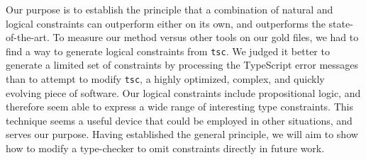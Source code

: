 \documentclass[sigplan,10pt,review,anonymous]{acmart} %
\theoremstyle{plain}
\theoremstyle{remark}
\theoremstyle{definition}
\begin{document}
Our purpose is to establish the principle that a combination of natural and logical constraints can outperform either on its own, and outperforms the state-of-the-art.
%
To measure our method versus other tools on our gold files, we had to find a way to generate logical constraints from \lstinline+tsc+.
%
We judged it better to generate a limited set of constraints by processing the
TypeScript error messages than to attempt to modify \lstinline+tsc+, a highly optimized, complex, and quickly evolving piece of software.
%
Our logical constraints include propositional logic, and therefore seem able to express a wide range of interesting type constraints.
%
This technique seems a useful device that could be employed in other situations, and serves our purpose.
%
Having established the general principle, we will aim to show how to modify a type-checker to omit constraints directly in future work.

\end{document}
